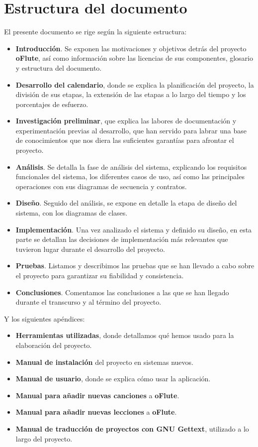 \section{Estructura del documento}
El presente documento se rige según la siguiente estructura:

\begin{itemize}
\item \textbf{Introducción}. Se exponen las motivaciones y objetivos detrás del
  proyecto \textbf{oFlute}, así como información sobre las licencias de sus
  componentes, glosario y estructura del documento.
\item \textbf{Desarrollo del calendario}, donde se explica la planificación del
  proyecto, la división de sus etapas, la extensión de las etapas a lo largo del
  tiempo y los porcentajes de esfuerzo.
\item \textbf{Investigación preliminar}, que explica las labores de
  documentación y experimentación previas al desarrollo, que han servido para
  labrar una base de conocimientos que nos diera las suficientes garantías para
  afrontar el proyecto.
\item \textbf{Análisis}. Se detalla la fase de análisis del sistema, explicando
  los requisitos funcionales del sistema, los diferentes casos de uso, así como
  las principales operaciones con sus diagramas de secuencia y contratos.
\item \textbf{Diseño}. Seguido del análisis, se expone en detalle la etapa de
  diseño del sistema, con los diagramas de clases.
\item \textbf{Implementación}. Una vez analizado el sistema y definido su
  diseño, en esta parte se detallan las decisiones de implementación más
  relevantes que tuvieron lugar durante el desarrollo del proyecto.
\item \textbf{Pruebas}. Listamos y describimos las pruebas que se han llevado a
  cabo sobre el proyecto para garantizar su fiabilidad y consistencia.
\item \textbf{Conclusiones}. Comentamos las conclusiones a las que se han
  llegado durante el transcurso y al término del proyecto.
\end{itemize}

Y los siguientes apéndices:
\begin{itemize}
\item \textbf{Herramientas utilizadas}, donde detallamos qué hemos usado para la
  elaboración del proyecto.
\item \textbf{Manual de instalación} del proyecto en sistemas nuevos.
\item \textbf{Manual de usuario}, donde se explica cómo usar la aplicación.
\item \textbf{Manual para añadir nuevas canciones} a \textbf{oFlute}.
\item \textbf{Manual para añadir nuevas lecciones} a \textbf{oFlute}.
\item \textbf{Manual de traducción de proyectos con GNU Gettext}, utilizado a lo
  largo del proyecto.
\end{itemize}

